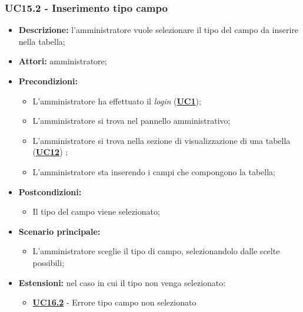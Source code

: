\subsubsection{UC15.2 - Inserimento tipo campo}
\label{sec:UC15.2}
\begin{itemize}
	\item \textbf{Descrizione:} l’amministratore vuole selezionare il tipo del campo da inserire nella tabella;
	\item \textbf{Attori:} amministratore;
	\item \textbf{Precondizioni:} 
	\begin{itemize}
		\item L’amministratore ha effettuato il \textit{login} (\hyperref[sec:UC1]{\textbf{UC1}});
		\item L’amministratore si trova nel pannello amministrativo;
		\item L’amministratore si trova nella sezione di visualizzazione di una tabella (\hyperref[sec:UC12]{\textbf{UC12}}) ;
		\item L’amministratore sta inserendo i campi che compongono la tabella;
	\end{itemize}
	\item \textbf{Postcondizioni:} 
	\begin{itemize}
		\item Il tipo del campo viene selezionato;
	\end{itemize}
	\item \textbf{Scenario principale:} 
	\begin{itemize}
		\item L’amministratore sceglie il tipo di campo, selezionandolo dalle scelte possibili;
	\end{itemize}
	\item \textbf{Estensioni:} nel caso in cui il tipo non venga selezionato:
	\begin{itemize}
		\item \hyperref[sec:UC16.2]{\textbf{UC16.2}} - Errore tipo campo non selezionato
	\end{itemize}
\end{itemize}

